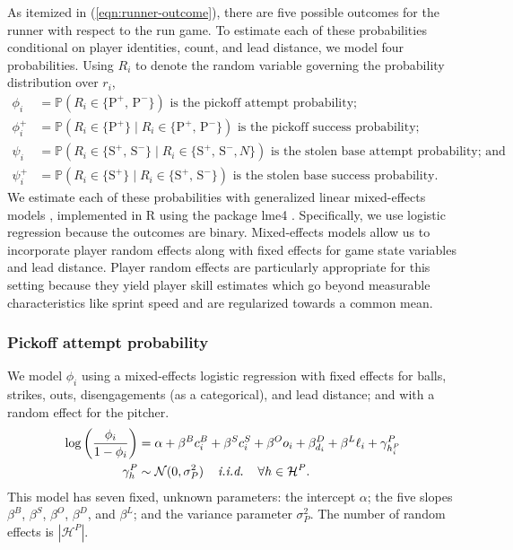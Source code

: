 \documentclass[11pt]{article}
\begin{document}
      As itemized in (\ref{eqn:runner-outcome}), there are five possible outcomes for the runner with respect to the run game. To estimate each of these probabilities conditional on player identities, count, and lead distance, we model four probabilities. Using $R_i$ to denote the random variable governing the probability distribution over $r_i$,
      \begin{align*}
        \phi_i    &= \mathbb{P}(R_i \in \{\mbox{P}^+,\, \mbox{P}^-\}) \mbox{ is the pickoff attempt probability;}\\
        \phi_i^+  &= \mathbb{P}(R_i \in \{\mbox{P}^+\} \mid R_i \in \{\mbox{P}^+,\, \mbox{P}^-\}) \mbox{ is the pickoff success probability;}\\
        \psi_i   &= \mathbb{P}(R_i \in \{\mbox{S}^+,\, \mbox{S}^-\} \mid R_i \in \{\mbox{S}^+,\, \mbox{S}^-, N\}) \mbox{ is the stolen base attempt probability; and}\\
        \psi_i^+ &= \mathbb{P}(R_i \in \{\mbox{S}^+\} \mid R_i \in \{\mbox{S}^+,\, \mbox{S}^-\}) \mbox{ is the stolen base success probability.}
      \end{align*}
      We estimate each of these probabilities with generalized linear mixed-effects models \parencite{stroup_generalized_2012}, implemented in R using the package lme4 \parencite{bates_fitting_2015}. Specifically, we use logistic regression because the outcomes are binary. Mixed-effects models allow us to incorporate player random effects along with fixed effects for game state variables and lead distance. Player random effects are particularly appropriate for this setting because they yield player skill estimates which go beyond measurable characteristics like sprint speed and are regularized towards a common mean.

      \subsubsection{Pickoff attempt probability}
      \label{sec:prob-po-attempt}

        We model $\phi_i$ using a mixed-effects logistic regression with fixed effects for balls, strikes, outs, disengagements (as a categorical), and lead distance; and with a random effect for the pitcher.
        \begin{align}
          \label{eqn:prob-po-attempt}
          \begin{split}
            \log\left(\frac{\phi_i}{1 - \phi_i}\right) &= \alpha + \beta^B c_i^B + \beta^S c_i^S + \beta^O o_i + \beta^D_{d_i} + \beta^L \ell_i + \gamma^P_{h_i^P}\\
            \gamma^P_{h} &\sim \mathcal{N}(0, \sigma^2_P) \hspace{4mm} \mbox{\it i.i.d.} \hspace{4mm} \forall h \in \mathcal{H}^P.
          \end{split}
        \end{align}
        This model has seven fixed, unknown parameters: the intercept $\alpha$; the five slopes $\beta^B$, $\beta^S$, $\beta^O$, $\beta^D$, and $\beta^L$; and the variance parameter $\sigma^2_P$. The number of random effects is $|\mathcal{H}^P|$.
        
\end{document}
